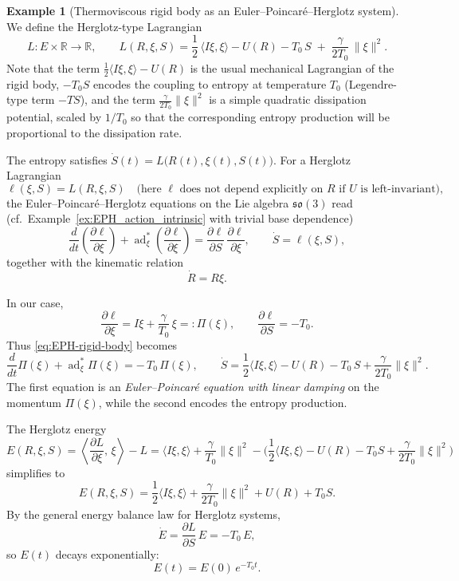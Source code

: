 \documentclass[11pt,a4paper]{article}
\theoremstyle{definition}
\newtheorem{example}[theorem]{Example}
\begin{document}
\begin{example}[Thermoviscous rigid body as an Euler--Poincar\'e--Herglotz system]
We define the Herglotz-type Lagrangian
\[
L\colon E\times\mathbb{R}\to\mathbb{R},\qquad
L(R,\xi,S)
= \frac{1}{2}\,\langle I\xi,\xi\rangle - U(R)
  - T_0\,S \;+\; \frac{\gamma}{2T_0}\,\lVert\xi\rVert^2.
\]
Note that the term $\frac{1}{2}\langle I\xi,\xi\rangle - U(R)$ is the usual mechanical
  Lagrangian of the rigid body, $-T_0 S$ encodes the coupling to entropy at temperature $T_0$
  (Legendre-type term $-TS$), and the term $\frac{\gamma}{2T_0}\|\xi\|^2$ is a simple quadratic
  dissipation potential, scaled by $1/T_0$ so that the corresponding
  entropy production will be proportional to the dissipation rate.


The entropy satisfies $\dot S(t) = L\big(R(t),\xi(t),S(t)\big)$. For a Herglotz Lagrangian
\[
\ell(\xi,S) = L(R,\xi,S)
\quad\text{(here $\ell$ does not depend explicitly on $R$ if $U$ is left-invariant),}
\]
the Euler--Poincar\'e--Herglotz equations on the Lie algebra
$\mathfrak{so}(3)$ read (cf.\ Example~\ref{ex:EPH_action_intrinsic}
with trivial base dependence)
\begin{equation}\label{eq:EPH-rigid-body}
\frac{d}{dt}\left(\frac{\partial \ell}{\partial \xi}\right)
+ \operatorname{ad}^*_{\xi}\!\left(\frac{\partial \ell}{\partial \xi}\right)
= \frac{\partial \ell}{\partial S}\,
  \frac{\partial \ell}{\partial \xi},
\qquad
\dot S = \ell(\xi,S),
\end{equation}
together with the kinematic relation
\[
\dot R = R\widehat{\xi}.
\]

In our case,
\[
\frac{\partial \ell}{\partial \xi}
= I\xi + \frac{\gamma}{T_0}\,\xi
=: \Pi(\xi),
\qquad
\frac{\partial \ell}{\partial S} = -T_0.
\]
Thus \eqref{eq:EPH-rigid-body} becomes
\begin{equation}\label{eq:EPH-rigid-body-explicit}
\frac{d}{dt}\Pi(\xi)
+ \operatorname{ad}^*_{\xi}\Pi(\xi)
= -\,T_0\,\Pi(\xi),
\qquad
\dot S
= \frac{1}{2}\langle I\xi,\xi\rangle - U(R)
  - T_0\,S + \frac{\gamma}{2T_0}\lVert\xi\rVert^2.
\end{equation}
The first equation is an \emph{Euler--Poincar\'e equation with linear
damping} on the momentum $\Pi(\xi)$, while the second encodes the entropy
production.


The Herglotz energy
\[
E(R,\xi,S) =
\left\langle \frac{\partial L}{\partial \xi},\,\xi\right\rangle - L
= \langle I\xi,\xi\rangle + \frac{\gamma}{T_0}\lVert\xi\rVert^2
  - \bigg(\frac{1}{2}\langle I\xi,\xi\rangle - U(R)
         -T_0 S + \frac{\gamma}{2T_0}\lVert\xi\rVert^2\bigg)
\]
simplifies to
\[
E(R,\xi,S)
= \frac{1}{2}\langle I\xi,\xi\rangle
  + \frac{\gamma}{2T_0}\lVert\xi\rVert^2
  + U(R) + T_0 S.
\]
By the general energy balance law for Herglotz systems,
\[
\dot E = \frac{\partial L}{\partial S}\,E = -T_0\,E,
\]
so $E(t)$ decays exponentially:
\[
E(t) = E(0)\,e^{-T_0 t}.
\]


\end{example}
\end{document}
